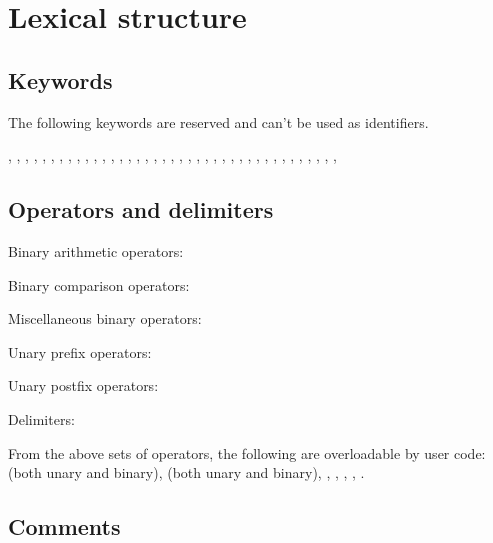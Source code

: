 
\chapter{Lexical structure}

\section{Keywords}

The following keywords are reserved and can't be used as identifiers.

, , , , , , , ,
, , , , , , , , , ,
, , , , , , , , ,
, , , , , , , , ,
, , , \code{\_}

\section{Operators and delimiters}

Binary arithmetic operators:

\code{+ - * / ** \% \& \&\& | || \string^ << >> += -= *= /= **= \%= \&= \&\&= |= ||= \string^= <<= >>=}

Binary comparison operators:

\code{== != < > <= >=}

Miscellaneous binary operators:


Unary prefix operators:

\code{+ - * \& ! \~{}}

Unary postfix operators:

\code{++ -- !}

Delimiters:


From the above sets of operators, the following are overloadable by user code:
\code{+} (both unary and binary), \code{-} (both unary and binary), \code{*},
\code{/}, \code{\%}, \code{==}, \code{<}.

\section{Comments}

